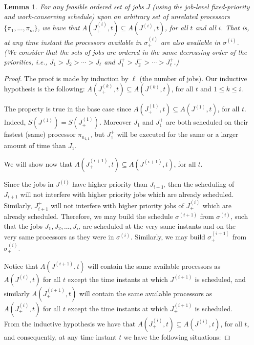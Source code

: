 \documentclass[a4paper,11pt]{article}
\newtheorem{Lemma}[Theorem]{Lemma}
\begin{document}
\begin{Lemma}\label{lemmaSoon} 
  For any feasible ordered set of jobs $J$ (using the
  job-level fixed-priority and work-conserving schedule) upon an
  arbitrary set of unrelated processors $\{\pi_1, \ldots, \pi_m\}$, we
  have that $A(J^{(i)}_{+},t) \subseteq A(J^{(i)},t)$, for all $t$ and
  all $i$. That is, at any time instant the processors available in
  ${\sigma^{(i)}_{+}}$ are also available in ${\sigma^{(i)}}$. (We
  consider that the sets of jobs are ordered in the same decreasing
  order of the priorities, i.e., $J_1 > J_2 > \cdots > J_{\ell}$ and
  $J_1^{+} > J_2^{+} > \cdots > J_{\ell}^{+}$.)
\end{Lemma}

\begin{proof}
  The proof is made by induction by $\ell$ (the number of jobs).  Our
  inductive hypothesis is the following: $A(J^{(k)}_{+},t) \subseteq
  A(J^{(k)},t)$, for all $t$ and $1 \leq k \leq i$.
 
  The property is true in the base case since $A(J^{(1)}_{+},t)
  \subseteq A(J^{(1)},t)$, for all $t$. Indeed, $S(J^{(1)}) =
  S(J^{(1)}_{+})$. Moreover $J_{1}$ and $J_{1}^{+}$ are both scheduled on
  their fastest (same) processor $\pi_{n_{1,1}}$, but $J_{1}^{+}$ will
  be executed for the same or a larger amount of time than $J_{1}$.

  We will show now that $A(J^{(i+1)}_{+},t) \subseteq
  A(J^{(i+1)},t)$, for all $t$.

  Since the jobs in $J^{(i)}$ have higher priority than $J_{i+1}$, then
  the scheduling of $J_{i+1}$ will not interfere with higher priority jobs
  which are already scheduled. Similarly, $J^{+}_{i+1}$ will not
  interfere with higher priority jobs of $J^{(i)}_{+}$ which are
  already scheduled. Therefore, we may build the schedule
  $\sigma^{(i+1)}$ from $\sigma^{(i)}$, such that the jobs $J_1, J_2,
  \ldots, J_{i}$, are scheduled at the very same instants and on the
  very same processors as they were in $\sigma^{(i)}$. Similarly, we
  may build $\sigma^{(i+1)}_{+}$ from $\sigma^{(i)}_{+}$.

  Notice that $A(J^{(i+1)},t)$ will contain the same available
  processors as $A(J^{(i)},t)$ for all $t$ except the time instants at
  which $J^{(i+1)}$ is scheduled, and similarly $A(J^{(i+1)}_{+},t)$
  will contain the same available processors as $A(J^{(i)}_{+},t)$ for
  all $t$ except the time instants at which $J^{(i+1)}_{+}$ is
  scheduled. From the inductive hypothesis we have that
  $A(J^{(i)}_{+},t) \subseteq A(J^{(i)},t)$, for all $t$, and
  consequently, at any time instant $t$ we have the following
  situations:


\end{proof}
\end{document}

